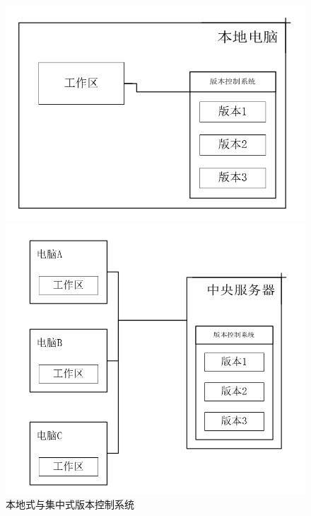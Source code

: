 \begin{figure}[ht]
    \centering
    \begin{minipage}[c]{0.45\textwidth}
        \includegraphics[width=\textwidth]{image/git/local-ver-control.png}
    \end{minipage}
    \begin{minipage}[c]{0.45\textwidth}
        \includegraphics[width=\textwidth]{image/git/merge-ver-control.png}
    \end{minipage}
    \caption{本地式与集中式版本控制系统}
    \label{lo-me-con}
\end{figure}


